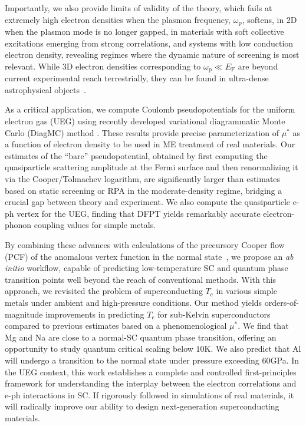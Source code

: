 \documentclass[%
 reprint,
superscriptaddress,
 amsmath,amssymb,
 aps,
prx,
]{revtex4-2}
\newcommand{\txc}{\text{c}}
\newcommand{\txp}{\text{p}}
\newcommand{\txF}{\text{F}}
\begin{document}
Importantly, we also provide limits of validity of the theory, which fails at extremely high electron densities when the  plasmon frequency, $\omega_\txp$,  softens, in 2D when the plasmon mode is no longer gapped, in materials with soft collective excitations emerging from strong correlations, and systems with low conduction electron density,  revealing regimes where the dynamic nature of screening is most relevant.
While 3D electron densities corresponding to $\omega_\txp \ll E_\txF$ are beyond current experimental reach terrestrially, they can be found in ultra-dense astrophysical objects~\cite{trubnikov1968white, ginzburg_superconductivity_1968}. 

As a critical application, we compute Coulomb pseudopotentials for the uniform electron gas (UEG) using recently developed variational diagrammatic Monte Carlo (DiagMC) method \cite{diagmc1,diagmc2,diagmc2010,detdiagmc,diagmclatest,diagmckozik,vdiagmc1,vdiagmc2}. These results provide precise parameterization of $\mu^*$ as a function of electron density to be used in ME treatment of real materials. Our estimates of the ``bare'' pseudopotential, obtained by  first computing the quasiparticle scattering amplitude at the Fermi surface  and then renormalizing it via the Cooper/Tolmachev logarithm, are significantly larger than estimates based on static screening or RPA in the moderate-density regime, bridging a crucial gap between 
theory and experiment. We also compute the quasiparticle e-ph vertex for the UEG, finding that DFPT yields remarkably accurate electron-phonon coupling values for simple metals.

By combining these advances with calculations of the precursory Cooper flow (PCF) of the anomalous vertex function 
in the normal state~\cite{pengcheng}, we propose an \emph{ab initio} workflow, capable of predicting low-temperature SC and quantum phase transition points well beyond the reach of conventional methods. 
With this approach, we revisited the problem of superconducting $T_\txc$ in various simple metals under ambient and high-pressure conditions. Our method yields orders-of-magnitude improvements in predicting $T_\txc$ for sub-Kelvin superconductors compared to previous estimates based on a phenomenological $\mu^*$.  We find that Mg and Na are close  to a normal-SC quantum phase transition, offering an opportunity to study quantum critical scaling below $10$K. We also predict that Al will undergo a transition to the normal state under pressure exceeding $60$GPa.  In the UEG context, this work establishes a complete and controlled first-principles framework for understanding the interplay between the electron correlations and e-ph interactions in SC. If rigorously followed in simulations of real materials, it will radically improve our ability to design next-generation superconducting materials.
\end{document}

